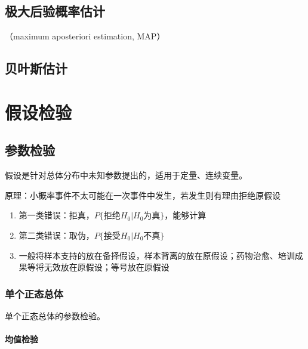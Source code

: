 \documentclass[12pt]{book}
\begin{document}
\section{极大后验概率估计}


（maximum aposteriori estimation, MAP）



\section{贝叶斯估计}


\chapter{假设检验}





\section{参数检验}



假设是针对总体分布中未知参数提出的，适用于定量、连续变量。

原理：小概率事件不太可能在一次事件中发生，若发生则有理由拒绝原假设
\begin{enumerate}[(1)]
    \item 第一类错误：拒真，$P\{拒绝H_0|H_0为真\}$，能够计算
    \item 第二类错误：取伪，$P\{接受H_0|H_0不真\}$
    \item 一般将样本支持的放在备择假设，样本背离的放在原假设；药物治愈、培训成果等将无效放在原假设；等号放在原假设
\end{enumerate}






\subsection{单个正态总体}





单个正态总体的参数检验。


\subsubsection{均值检验}
\end{document}
